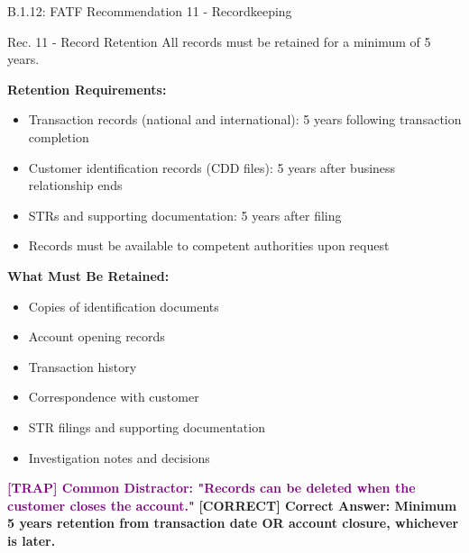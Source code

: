 \documentclass[11pt,a4paper]{beamer}
\newcommand{\trap}[1]{\textcolor{purple}{\textbf{[TRAP] #1}}}
\newcommand{\correct}[1]{\textcolor{green!50!black}{\textbf{[CORRECT] #1}}}
\begin{document}
	\begin{frame}{B.1.12: FATF Recommendation 11 - Recordkeeping}
		\begin{block}{Rec. 11 - Record Retention}
			All records must be retained for a minimum of 5 years.
		\end{block}
		\textbf{Retention Requirements:}
		\begin{itemize}
			\item Transaction records (national and international): 5 years following transaction completion
			\item Customer identification records (CDD files): 5 years after business relationship ends
			\item STRs and supporting documentation: 5 years after filing
			\item Records must be available to competent authorities upon request
		\end{itemize}
		\textbf{What Must Be Retained:}
		\begin{itemize}
			\item Copies of identification documents
			\item Account opening records
			\item Transaction history
			\item Correspondence with customer
			\item STR filings and supporting documentation
			\item Investigation notes and decisions
		\end{itemize}
		\trap{Common Distractor: "Records can be deleted when the customer closes the account."}
		\correct{Correct Answer: Minimum 5 years retention from transaction date OR account closure, whichever is later.}
	\end{frame}
	
\end{document}
